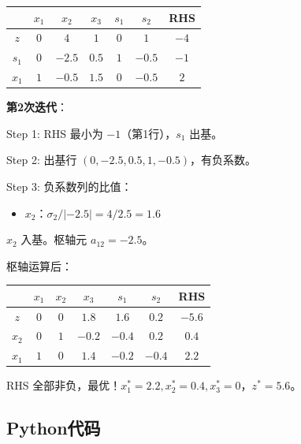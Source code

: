 \begin{example}[对偶单纯形法]
\begin{table}[H]
\centering
\begin{tabular}{@{}c|ccccc|c@{}}
\toprule
& $x_1$ & $x_2$ & $x_3$ & $s_1$ & $s_2$ & RHS \\
\midrule
$z$ & $0$ & $4$ & $1$ & $0$ & $1$ & $-4$ \\
\midrule
$s_1$ & $0$ & $-2.5$ & $0.5$ & $1$ & $-0.5$ & $-1$ \\
$x_1$ & $1$ & $-0.5$ & $1.5$ & $0$ & $-0.5$ & $2$ \\
\bottomrule
\end{tabular}
\end{table}

\textbf{第2次迭代}：

Step 1: RHS 最小为 $-1$（第1行），$s_1$ 出基。

Step 2: 出基行 $(0, -2.5, 0.5, 1, -0.5)$，有负系数。

Step 3: 负系数列的比值：
\begin{itemize}
    \item $x_2$：$\sigma_2/|{-2.5}| = 4/2.5 = 1.6$
\end{itemize}

$x_2$ 入基。枢轴元 $a_{12} = -2.5$。

枢轴运算后：

\begin{table}[H]
\centering
\begin{tabular}{@{}c|ccccc|c@{}}
\toprule
& $x_1$ & $x_2$ & $x_3$ & $s_1$ & $s_2$ & RHS \\
\midrule
$z$ & $0$ & $0$ & $1.8$ & $1.6$ & $0.2$ & $-5.6$ \\
\midrule
$x_2$ & $0$ & $1$ & $-0.2$ & $-0.4$ & $0.2$ & $0.4$ \\
$x_1$ & $1$ & $0$ & $1.4$ & $-0.2$ & $-0.4$ & $2.2$ \\
\bottomrule
\end{tabular}
\end{table}

RHS 全部非负，最优！$x_1^* = 2.2, x_2^* = 0.4, x_3^* = 0$，$z^* = 5.6$。
\end{example}

\subsection{Python代码}\label{sec:dualsimplex-code}

